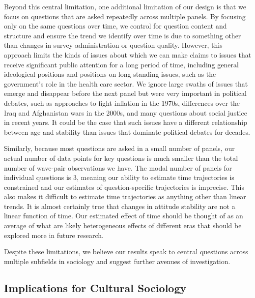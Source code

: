 \documentclass[
  12pt,
]{article}
\begin{document}
Beyond this central limitation, one additional limitation of our design is that we focus on questions that are asked repeatedly across multiple panels. By focusing only on the same questions over time, we control for question content and structure and ensure the trend we identify over time is due to something other than changes in survey administration or question quality. However, this approach limits the kinds of issues about which we can make claims to issues that receive significant public attention for a long period of time, including general ideological positions and positions on long-standing issues, such as the government's role in the health care sector. We ignore large swaths of issues that emerge and disappear before the next panel but were very important in political debates, such as approaches to fight inflation in the 1970s, differences over the Iraq and Afghanistan wars in the 2000s, and many questions about social justice in recent years. It could be the case that such issues have a different relationship between age and stability than issues that dominate political debates for decades.

Similarly, because most questions are asked in a small number of panels, our actual number of data points for key questions is much smaller than the total number of wave-pair observations we have. The modal number of panels for individual questions is 3, meaning our ability to estimate time trajectories is constrained and our estimates of question-specific trajectories is imprecise. This also makes it difficult to estimate time trajectories as anything other than linear trends. It is almost certainly true that changes in attitude stability are not a linear function of time. Our estimated effect of time should be thought of as an average of what are likely heterogeneous effects of different eras that should be explored more in future research.

Despite these limitations, we believe our results speak to central questions across multiple subfields in sociology and suggest further avenues of investigation.

\hypertarget{implications-for-cultural-sociology}{%
\subsection{Implications for Cultural Sociology}\label{implications-for-cultural-sociology}}
\end{document}

